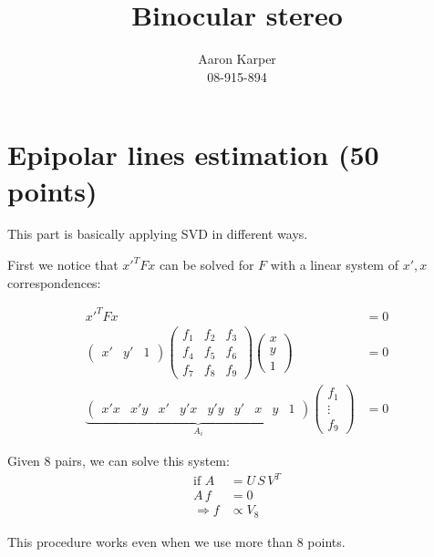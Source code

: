 \documentclass{paper}
\title{Binocular stereo}
\author{Aaron Karper\\08-915-894}
\begin{document}
\maketitle


%

\section{Epipolar lines estimation (50 points)}
This part is basically applying SVD in different ways.

First we notice that $x'^T F x$ can be solved for $F$ with a linear system of $x', x$ correspondences:

\begin{align*}
x'^TFx &= 0\\
\begin{pmatrix}x' &y' &1\end{pmatrix} 
\begin{pmatrix}f_1& f_2 &f_3\\ f_4& f_5& f_6\\ f_7& f_8& f_9\end{pmatrix}
\begin{pmatrix}x\\ y\\ 1\end{pmatrix} &= 0\\ 
\underbrace{\begin{pmatrix}x'x & x'y & x' & y'x & y'y & y'& x & y& 1\end{pmatrix}}_{A_i} \begin{pmatrix}
f_1\\
\vdots\\
f_9
\end{pmatrix} &= 0
\end{align*}

Given 8 pairs, we can solve this system:
\begin{align*}
\text{if } A &= U\, S\, V^T\\
A\, f &= 0\\
\Rightarrow f &\propto V_8
\end{align*}

This procedure works even when we use more than 8 points.
\end{document}
